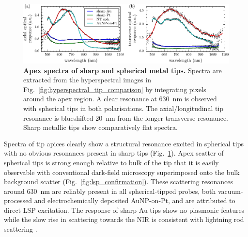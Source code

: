 \documentclass{article}
\begin{document}
\begin{figure}[bt]
\centering
\includegraphics{figures/apex_spectra_comparison}
\caption[Apex spectra of sharp and spherical metal tips]{\textbf{Apex spectra of sharp and spherical metal tips.} Spectra are extracted from the hyperspectral images in Fig.~\ref{fig:hyperspectral_tip_comparison} by integrating pixels around the apex region. A clear resonance at \SI{630}{nm} is observed with spherical tips in both polarisations. The axial/longitudinal tip resonance is blueshifted \SI{20}{nm} from the longer transverse resonance. Sharp metallic tips show comparatively flat spectra.}
\label{fig:apex_spectra}
\vspace{-5pt}
\end{figure}

Spectra of tip apices clearly show a structural resonance excited in spherical tips with no obvious resonances present in sharp tips (Fig.~\ref{fig:apex_spectra}). Apex scatter of spherical tips is strong enough relative to bulk of the tip that it is easily observable with conventional dark-field microscopy  superimposed onto the bulk background scatter (Fig.~\ref{fig:lsp_confirmation}). These scattering resonances around \SI{630}{nm} are reliably present in all spherical-tipped probes, both vacuum-processed and electrochemically deposited AuNP-on-Pt, and are attributed to direct LSP excitation. The response of sharp Au tips show no plasmonic features while the slow rise in scattering towards the NIR is consistent with lightning rod scattering \cite{zhang2009}.
\end{document}
